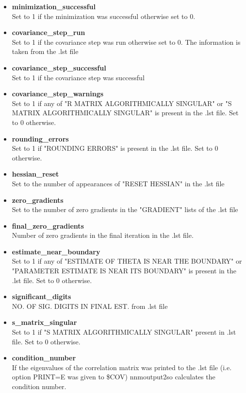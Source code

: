 \begin{itemize}
    \item \textbf{minimization\_successful} \\ Set to 1 if the minimization was successful otherwise set to 0.
    \item \textbf{covariance\_step\_run} \\ Set to 1 if the covariance step was run otherwise set to 0. The information is taken from the .lst file
    \item \textbf{covariance\_step\_successful} \\ Set to 1 if the covariance step was successful
    \item \textbf{covariance\_step\_warnings} \\ Set to 1 if any of "R MATRIX ALGORITHMICALLY SINGULAR" or "S MATRIX ALGORITHMICALLY SINGULAR" is present in the .lst file. Set to 0 otherwise.
    \item \textbf{rounding\_errors} \\ Set to 1 if "ROUNDING ERRORS" is present in the .lst file.  Set to 0 otherwise.
    \item \textbf{hessian\_reset} \\ Set to the number of appearances of "RESET HESSIAN" in the .lst file
    \item \textbf{zero\_gradients} \\ Set to the number of zero gradients in the "GRADIENT" lists of the .lst file
    \item \textbf{final\_zero\_gradients} \\ Number of zero gradients in the final iteration in the .lst file.
    \item \textbf{estimate\_near\_boundary} \\ Set to 1 if any of "ESTIMATE OF THETA IS NEAR THE BOUNDARY" or "PARAMETER ESTIMATE IS NEAR ITS BOUNDARY" is present in the .lst file. Set to 0 otherwise.
    \item \textbf{significant\_digits} \\ NO. OF SIG. DIGITS IN FINAL EST. from .lst file
    \item \textbf{s\_matrix\_singular} \\ Set to 1 if "S MATRIX ALGORITHMICALLY SINGULAR" present in .lst file. Set to 0 otherwise.
    \item \textbf{condition\_number} \\ If the eigenvalues of the correlation matrix was printed to the .lst file (i.e. option PRINT=E was given to \$COV) nnmoutput2so calculates the condition number. 
\end{itemize}


